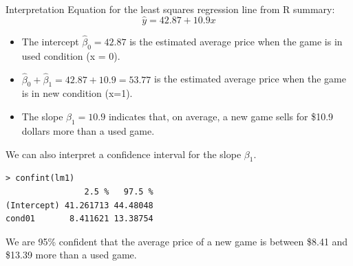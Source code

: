 \documentclass[10pt]{beamer}
\begin{document}
\begin{frame}{Interpretation}
Equation for the least squares regression line from R summary:\\
$$\hat{y} = 42.87 + 10.9 x$$

\begin{itemize}
\item The intercept $\hat{\beta}_0 = 42.87$ is the estimated average price when the game is in used condition (x = 0).
\vspace{5pt}
\item $\hat{\beta}_0 + \hat{\beta}_1 = 42.87 + 10.9 = 53.77$ is the estimated average price when the game is in new condition (x=1).
\vspace{5pt}
\item The slope $\hat{\beta}_1 = 10.9$ indicates that, on average, a new game sells for \$10.9 dollars more than a used game.
\end{itemize}
\end{frame}

\begin{frame}[fragile]{}
We can also interpret a confidence interval for the slope $\beta_1$.

\begin{verbatim}
> confint(lm1)
                2.5 %   97.5 %
(Intercept) 41.261713 44.48048
cond01       8.411621 13.38754
\end{verbatim}
\vspace{10pt}

We are 95\% confident that the average price of a new game is between \$8.41 and \$13.39 more than a used game.
\end{frame}
\end{document}

